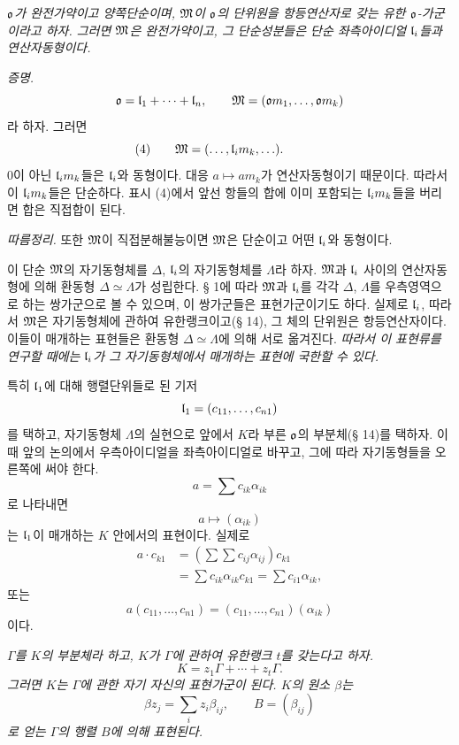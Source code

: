 \emph{\(\mathfrak o\)가 완전가약이고 양쪽단순이며, \(\mathfrak M\)이 \(\mathfrak o\)의 단위원을 항등연산자로 갖는 유한 \(\mathfrak o\)-가군이라고 하자. 그러면 \(\mathfrak M\)은 완전가약이고, 그 단순성분들은 단순 좌측아이디얼 \(\mathfrak l_i\)들과 연산자동형이다.}

\emph{증명.} 
\[
        \mathfrak o=\mathfrak l_1+\cdots+\mathfrak l_n,
        \qquad
        \mathfrak M=(\mathfrak o m_1,\ldots,\mathfrak o m_k)
\]
라 하자. 그러면
\[
\makebox[0pt][r]{(4)\qquad}\mM=(\ldots,\ml_i m_k,\ldots).
\]
0이 아닌 \(\mathfrak l_i m_k\)들은 \(\mathfrak l_i\)와 동형이다. 대응 \(a\mapsto am_k\)가 연산자동형이기 때문이다. 따라서 이 \(\mathfrak l_i m_k\)들은 단순하다. 표시 (4)에서 앞선 항들의 합에 이미 포함되는 \(\mathfrak l_i m_k\)들을 버리면 합은 직접합이 된다.

\emph{따름정리.} 또한 \(\mathfrak M\)이 직접분해불능이면 \(\mathfrak M\)은 단순이고 어떤 \(\mathfrak l_i\)와 동형이다.

이 단순 \(\mathfrak M\)의 자기동형체를 \(\Delta\), \(\mathfrak l_i\)의 자기동형체를 \(\Lambda\)라 하자. \(\mathfrak M\)과 \(\mathfrak l_i\) 사이의 연산자동형에 의해 환동형 \(\Delta\simeq\Lambda\)가 성립한다. § 1에 따라 \(\mathfrak M\)과 \(\mathfrak l_i\)를 각각 \(\Delta\), \(\Lambda\)를 우측영역으로 하는 쌍가군으로 볼 수 있으며, 이 쌍가군들은 표현가군이기도 하다. 실제로 \(\mathfrak l_i\), 따라서 \(\mathfrak M\)은 자기동형체에 관하여 유한랭크이고(§ 14), 그 체의 단위원은 항등연산자이다. 이들이 매개하는 표현들은 환동형 \(\Delta\simeq\Lambda\)에 의해 서로 옮겨진다. \emph{따라서 이 표현류를 연구할 때에는 \(\mathfrak l_i\)가 그 자기동형체에서 매개하는 표현에 국한할 수 있다.}

특히 \(\mathfrak l_1\)에 대해 행렬단위들로 된 기저
\[
        \mathfrak l_1=(c_{11},\ldots,c_{n1})
\]
를 택하고, 자기동형체 \(\Lambda\)의 실현으로 앞에서 \(K\)라 부른 \(\mathfrak o\)의 부분체(§ 14)를 택하자. 이때 앞의 논의에서 우측아이디얼을 좌측아이디얼로 바꾸고, 그에 따라 자기동형들을 오른쪽에 써야 한다. 
\[
        a=\sum c_{ik}\alpha_{ik}
\]
로 나타내면
\[
        a\longmapsto(\alpha_{ik})
\]
는 \(\mathfrak l_1\)이 매개하는 \(K\) 안에서의 표현이다. 실제로
\[
\begin{aligned}
        a\cdot c_{k1}
        &=\left(\sum\sum c_{ij}\alpha_{ij}\right)c_{k1}\\
        &=\sum c_{ik}\alpha_{ik}c_{k1}
         =\sum c_{i1}\alpha_{ik},
\end{aligned}
\]
또는
\[
        a(c_{11},\ldots,c_{n1})
        =(c_{11},\ldots,c_{n1})(\alpha_{ik})
\]
이다.

\emph{\(\Gamma\)를 \(K\)의 부분체라 하고, \(K\)가 \(\Gamma\)에 관하여 유한랭크 \(t\)를 갖는다고 하자.}
\[
        K=z_1\Gamma+\cdots+z_t\Gamma.
\]
\emph{그러면 \(K\)는 \(\Gamma\)에 관한 자기 자신의 표현가군이 된다. \(K\)의 원소 \(\beta\)는}
\[
        \beta z_j=\sum_i z_i\beta_{ij},
        \qquad B=(\beta_{ij})
\]
\emph{로 얻는 \(\Gamma\)의 행렬 \(B\)에 의해 표현된다.}

